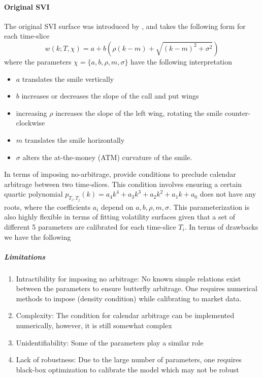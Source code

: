 \documentclass[11pt,letterpaper]{article}
\begin{document}
\paragraph{Original SVI}
The original SVI surface was introduced by \cite{gatheral2014arbitrage}, \cite{gatheral2004parsimonious} and takes the following form for each time-slice
\[
w(k;T, \chi) = a + b (\rho (k - m) + \sqrt{(k-m)^2 + \sigma^2  } )
\]
where the parameters $\chi= \{a,b,\rho,m,\sigma\}$ have the following interpretation 
\begin{itemize}
\item $a$ translates the smile vertically
\item $b$ increases or decreases the slope of the call and put wings
\item increasing $\rho$ increases the slope of the left wing, rotating the smile counter-clockwise
\item $m$ translates the smile horizontally
\item $\sigma$ alters the at-the-money (ATM) curvature of the smile.
\end{itemize}
In terms of imposing no-arbitrage, \cite{gatheral2014arbitrage} provide conditions to preclude calendar arbitrage between two time-slices. This condition involves ensuring a certain quartic polynomial $p_{T_i,T_j}(k) = a_4k^4 + a_3k^3 + a_2k^2 + a_1k + a_0$ does not have any roots, where the coefficients $a_i$ depend on $a,b, \rho, m,\sigma$. This parameterization is also highly flexible in terms of fitting volatility surfaces given that a set of different 5 parameters are calibrated for each time-slice $T_i$. In terms of drawbacks we have the following

\subparagraph{Limitations}
\begin{enumerate}
\item  Intractibility for imposing no arbitrage:  No known simple relations exist between the parameters to ensure butterfly arbitrage\label{item:NoButterfly}. One requires numerical methods to impose (density condition) while calibrating to market data. 
\item Complexity: The condition for calendar arbitrage can be implemented numerically, however, it is still somewhat complex 
\item Unidentifiability: Some of the parameters play a similar role
\item Lack of robustness: Due to the large number of parameters, one requires black-box optimization to calibrate the model which may not be robust  
\end{enumerate} 
 
\end{document}
